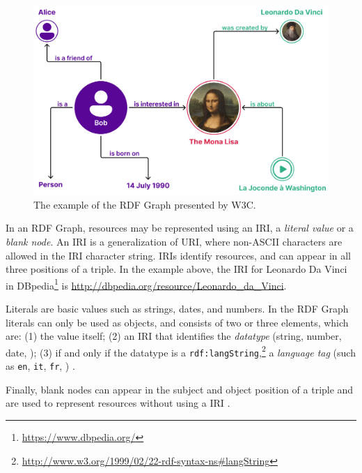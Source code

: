 \begin{figure}[!ht]
    \centering
    \includegraphics[width=0.95\columnwidth]{images/rdf/rdf-graph-example}
    \caption{The example of the \ac{RDF} Graph presented by \ac{W3C}.}
    \label{fig:rdf-graph-examle}
\end{figure}

In an \ac{RDF} Graph, resources may be represented using an \ac{IRI}, a \textit{literal value} or a \textit{blank node}. An \ac{IRI} is a generalization of \ac{URI}, where non-\acs{ASCII} characters are allowed in the \ac{IRI} character string. \acp{IRI} identify resources, and can appear in all three positions of a triple. In the example above, the \ac{IRI} for Leonardo Da Vinci in DBpedia\footnote{\url{https://www.dbpedia.org/}} is \url{http://dbpedia.org/resource/Leonardo_da_Vinci}.

Literals are basic values such as strings, dates, and numbers. In the \ac{RDF} Graph literals can only be used as objects, and consists of two or three elements, which are: (1) the value itself; (2) an \ac{IRI} that identifies the \textit{datatype} (string, number, date, \etc); (3) if and only if the datatype is a \texttt{rdf:langString},\footnote{\url{http://www.w3.org/1999/02/22-rdf-syntax-ns\#langString}} a \textit{language tag} (such as \texttt{en}, \texttt{it}, \texttt{fr}, \etc) \cite{world2014rdfconcepts}.

Finally, blank nodes can appear in the subject and object position of a triple and are used to represent resources without using a \ac{IRI} \cite{world2014rdfprimer}.

